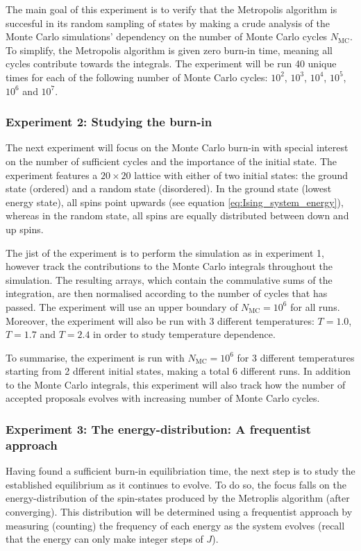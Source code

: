 \documentclass[nofootinbib,reprint,english]{revtex4-1}
\begin{document}
The main goal of this experiment is to verify that the Metropolis algorithm is succesful in its random sampling of states by making a crude analysis of the Monte Carlo simulations' dependency on the number of Monte Carlo cycles \(N_\text{MC}\). To simplify, the Metropolis algorithm is given zero burn-in time, meaning all cycles contribute towards the integrals. The experiment will be run 40 unique times for each of the following number of Monte Carlo cycles: \(10^2\), \(10^3\), \(10^4\), \(10^5\), \(10^6\) and \(10^7\).
\subsubsection{Experiment 2: Studying the burn-in}
The next experiment will focus on the Monte Carlo burn-in with special interest on the number of sufficient cycles and the importance of the initial state. The experiment features a \(20\times20\) lattice with either of two initial states: the ground state (ordered) and a random state (disordered). In the ground state (lowest energy state), all spins point upwards (see equation \eqref{eq:Ising_system_energy}), whereas in the random state, all spins are equally distributed between down and up spins.

The jist of the experiment is to perform the simulation as in experiment 1, however track the contributions to the Monte Carlo integrals throughout the simulation. The resulting arrays, which contain the commulative sums of the integration, are then normalised according to the number of cycles that has passed. The experiment will use an upper boundary of \(N_\text{MC}=10^6\) for all runs. Moreover, the experiment will also be run with 3 different temperatures: \(T=1.0\), \(T=1.7\) and \(T=2.4\) in order to study temperature dependence.

To summarise, the experiment is run with \(N_\text{MC}=10^6\) for 3 different temperatures starting from 2 dfferent initial states, making a total 6 different runs. In addition to the Monte Carlo integrals, this experiment will also track how the number of accepted proposals evolves with increasing number of Monte Carlo cycles.
\subsubsection{Experiment 3: The energy-distribution: A frequentist approach}
Having found a sufficient burn-in equilibriation time, the next step is to study the established equilibrium as it continues to evolve. To do so, the focus falls on the energy-distribution of the spin-states produced by the Metroplis algorithm (after converging). This distribution will be determined using a frequentist approach by measuring (counting) the frequency of each energy as the system evolves (recall that the energy can only make integer steps of \(J\)).
\end{document}
